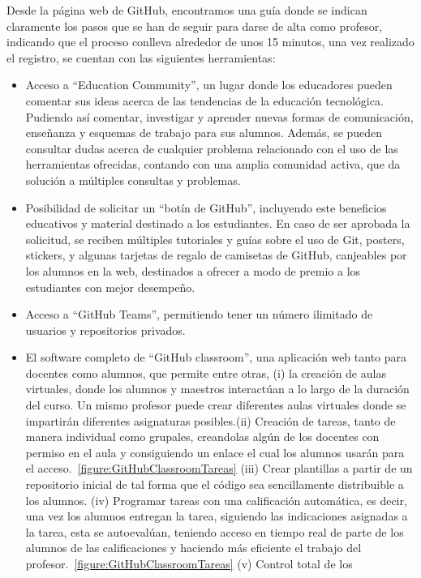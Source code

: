 Desde la página web de GitHub, encontramos una guía donde se indican
claramente los pasos que se han de seguir para darse de alta como profesor,
indicando que el proceso conlleva alrededor de unos 15 minutos, una vez
realizado el registro, se cuentan con las siguientes herramientas:
\begin{itemize}
\item Acceso a ``Education Community'', un lugar donde los educadores
  pueden comentar sus ideas acerca de las tendencias de la educación
  tecnológica. Pudiendo así comentar, investigar y aprender nuevas formas
  de comunicación, enseñanza y esquemas de trabajo para sus alumnos.
  Además, se pueden consultar dudas acerca de cualquier problema
  relacionado con el uso de las herramientas ofrecidas, contando con una
  amplia comunidad activa, que da solución a múltiples consultas y
  problemas.
\item Posibilidad de solicitar un ``botín de GitHub'', incluyendo este
  beneficios educativos y material destinado a los estudiantes. En caso de
  ser aprobada la solicitud, se reciben múltiples tutoriales y guías sobre
  el uso de Git, posters, stickers, y algunas tarjetas de regalo de
  camisetas de GitHub, canjeables por los alumnos en la web, destinados a
  ofrecer a modo de premio a los estudiantes con mejor desempeño.
\item Acceso a ``GitHub Teams'', permitiendo tener un número ilimitado de
  usuarios y repositorios privados.
\item El software completo de “GitHub classroom”, una aplicación web tanto para docentes como alumnos, que permite entre otras, (i) la creación de aulas virtuales, donde los alumnos y maestros interactúan a lo largo de la duración del curso. Un mismo profesor puede crear diferentes aulas virtuales donde se impartirán diferentes asignaturas posibles.(ii) Creación de tareas, tanto de manera individual como grupales, creandolas algún de los docentes con permiso en el aula y consiguiendo un enlace el cual los alumnos usarán para el acceso.~\ref{figure:GitHubClassroomTareas} (iii) Crear plantillas a partir de un
  repositorio inicial de tal forma que el código sea sencillamente
  distribuible a los alumnos. (iv) Programar tareas con una calificación
  automática, es decir, una vez los alumnos entregan la tarea, siguiendo
  las indicaciones asignadas a la tarea, esta se autoevalúan, teniendo
  acceso en tiempo real de parte de los alumnos de las calificaciones y
  haciendo más eficiente el trabajo del profesor.~\ref{figure:GitHubClassroomTareas} (v) Control total de los

\end{itemize}
